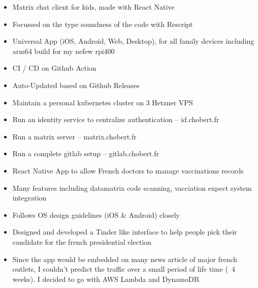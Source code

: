 \documentclass[10pt,a4paper,ragged2e,withhyper]{altacv}
\begin{document}
\begin{paracol}{2}

\begin{itemize}
  \item Matrix chat client for kids, made with React Native
  \item Focussed on the type soundness of the code with Rescript
  \item Universal App (iOS, Android, Web, Desktop), for all family devices including arm64 build for my nefew rpi400
  \item CI / CD on Github Action
  \item Auto-Updated based on Github Releases
\end{itemize}

\newpage

\begin{itemize}
  \item Maintain a personal kubernetes cluster on 3 Hetzner VPS
  \item Run an identity service to centralize authentication -- id.chobert.fr
  \item Run a matrix server -- matrix.chobert.fr
  \item Run a complete gitlab setup -- gitlab.chobert.fr
\end{itemize}

\divider

\begin{itemize}
  \item React Native App to allow French doctors to manage vaccinations records
  \item Many features including datamatrix code scanning, vacciation expect system integration
  \item Follows OS design guidelines (iOS \& Android) closely
\end{itemize}

\divider

\begin{itemize}
  \item Designed and developed a Tinder like interface to help people pick their candidate for the french presidential election
  \item Since the app would be embedded on many news article of major french outlets,
    I couldn't predict the traffic over a small period of life time (~4 weeks).
    I decided to go with AWS Lambda and DynamoDB.
\end{itemize}


\end{paracol}
\end{document}
